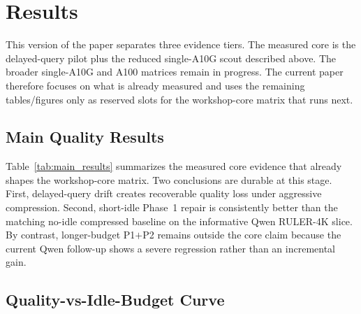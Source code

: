 \documentclass[10pt,twocolumn,letterpaper]{article}
\begin{document}
\section{Results}
\label{sec:results}

This version of the paper separates three evidence tiers.
The measured core is the delayed-query pilot plus the reduced single-A10G scout
described above. The broader single-A10G and A100 matrices remain in progress.
The current paper therefore focuses on what is already measured and uses the
remaining tables/figures only as reserved slots for the workshop-core matrix
that runs next.

\subsection{Main Quality Results}

Table~\ref{tab:main_results} summarizes the measured core evidence that already
shapes the workshop-core matrix.
Two conclusions are durable at this stage.
First, delayed-query drift creates recoverable quality loss under aggressive
compression.
Second, short-idle Phase~1 repair is consistently better than the matching
no-idle compressed baseline on the informative Qwen RULER-4K slice.
By contrast, longer-budget P1$+$P2 remains outside the core claim because the
current Qwen follow-up shows a severe regression rather than an incremental
gain.

\begin{table}[t]
\centering
\caption{Measured core evidence that currently supports the workshop claim.
The first row is the delayed-query mechanism gate; the remaining rows are the
informative Qwen RULER-4K scout slices.}
\label{tab:main_results}
\end{table}

\subsection{Quality-vs-Idle-Budget Curve}
\end{document}
